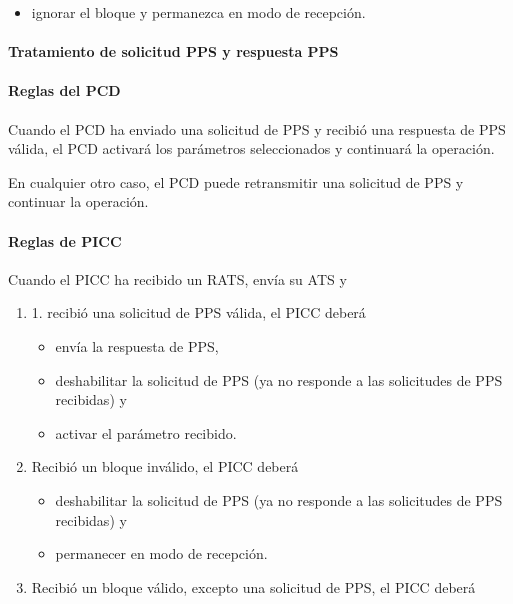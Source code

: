 \begin{itemize}
	\item ignorar el bloque y permanezca en modo de recepción.
\end{itemize}\par

\paragraph{Tratamiento de solicitud PPS y respuesta PPS}
\paragraph{Reglas del PCD}
Cuando el PCD ha enviado una solicitud de PPS y recibió una respuesta de PPS válida, el PCD activará los parámetros seleccionados y continuará la operación.\par

En cualquier otro caso, el PCD puede retransmitir una solicitud de PPS y continuar la operación.\par

\paragraph{Reglas de PICC }
Cuando el PICC ha recibido un RATS, envía su ATS y\par

\begin{enumerate}
	\item 1. recibió una solicitud de PPS válida, el PICC deberá\par

\begin{itemize}
	\item envía la respuesta de PPS,\par

	\item deshabilitar la solicitud de PPS (ya no responde a las solicitudes de PPS recibidas) y\par

	\item activar el parámetro recibido.
\end{itemize}\par

	\item Recibió un bloque inválido, el PICC deberá\par

\begin{itemize}
	\item deshabilitar la solicitud de PPS (ya no responde a las solicitudes de PPS recibidas) y\par

	\item permanecer en modo de recepción.
\end{itemize}\par

	\item Recibió un bloque válido, excepto una solicitud de PPS, el PICC deberá
\end{enumerate}\par

